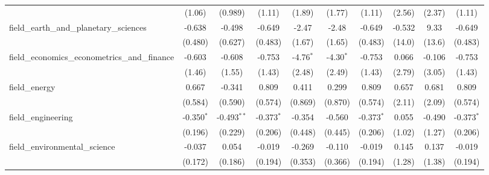 \begin{tabular}{lccccccccc}
                                                               & (1.06)         & (0.989)        & (1.11)        & (1.89)         & (1.77)         & (1.11)        & (2.56)       & (2.37)      & (1.11)\\   
   field\_earth\_and\_planetary\_sciences                      & -0.638         & -0.498         & -0.649        & -2.47          & -2.48          & -0.649        & -0.532       & 9.33        & -0.649\\   
                                                               & (0.480)        & (0.627)        & (0.483)       & (1.67)         & (1.65)         & (0.483)       & (14.0)       & (13.6)      & (0.483)\\   
   field\_economics\_econometrics\_and\_finance                & -0.603         & -0.608         & -0.753        & -4.76$^{*}$    & -4.30$^{*}$    & -0.753        & 0.066        & -0.106      & -0.753\\   
                                                               & (1.46)         & (1.55)         & (1.43)        & (2.48)         & (2.49)         & (1.43)        & (2.79)       & (3.05)      & (1.43)\\   
   field\_energy                                               & 0.667          & -0.341         & 0.809         & 0.411          & 0.299          & 0.809         & 0.657        & 0.681       & 0.809\\   
                                                               & (0.584)        & (0.590)        & (0.574)       & (0.869)        & (0.870)        & (0.574)       & (2.11)       & (2.09)      & (0.574)\\   
   field\_engineering                                          & -0.350$^{*}$   & -0.493$^{**}$  & -0.373$^{*}$  & -0.354         & -0.560         & -0.373$^{*}$  & 0.055        & -0.490      & -0.373$^{*}$\\   
                                                               & (0.196)        & (0.229)        & (0.206)       & (0.448)        & (0.445)        & (0.206)       & (1.02)       & (1.27)      & (0.206)\\   
   field\_environmental\_science                               & -0.037         & 0.054          & -0.019        & -0.269         & -0.110         & -0.019        & 0.145        & 0.137       & -0.019\\   
                                                               & (0.172)        & (0.186)        & (0.194)       & (0.353)        & (0.366)        & (0.194)       & (1.28)       & (1.38)      & (0.194)\\   

\end{tabular}
